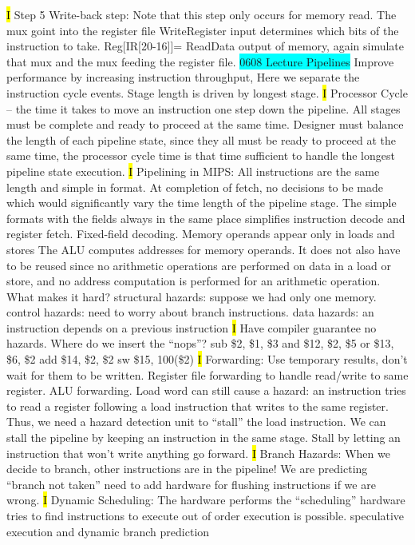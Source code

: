 \documentclass[fontsize=4pt]{scrartcl}
\begin{document}
\hl{I}
Step 5 Write-back step: Note that this step only occurs for memory read. The mux goint into the register file WriteRegister input determines which bits of the instruction to take.
Reg[IR[20-16]]= ReadData output of memory, again simulate that mux and the mux feeding the register file.
\colorbox{Cyan}{0608 Lecture Pipelines} Improve performance by increasing instruction throughput, Here we separate the instruction cycle events.  Stage length is driven by longest stage.
\hl{I}
Processor Cycle – the time it takes to move an instruction one step down the pipeline. All stages must be complete and ready to proceed at the same time. Designer must balance the length of each pipeline state, since they all must be ready to proceed at the same time, the processor cycle time is that time sufficient to handle the longest pipeline state execution.
\hl{I}
Pipelining in MIPS: All instructions are the same length and simple in format. At completion of fetch, no decisions to be made which would significantly vary the time length of the pipeline stage. The simple formats with the fields always in the same place simplifies instruction decode and register fetch.  Fixed-field decoding. Memory operands appear only in loads and stores
The ALU computes addresses for memory operands. It does not also have to be reused since no arithmetic operations are performed on data in a load or store, and no address computation is performed for an arithmetic operation. What makes it hard? structural hazards:  suppose we had only one memory. control hazards:  need to worry about branch instructions. data hazards:  an instruction depends on a previous instruction
\hl{I}
Have compiler guarantee no hazards. Where do we insert the “nops”? sub	\$2, \$1, \$3 and \$12, \$2, \$5 or	\$13, \$6, \$2 add	\$14, \$2, \$2	sw	\$15, 100(\$2)
\hl{I}
Forwarding: Use temporary results, don’t wait for them to be written. Register file forwarding to handle read/write to same register. ALU forwarding. Load word can still cause a hazard: an instruction tries to read a register following a load instruction that writes to the same register. Thus, we need a hazard detection unit to “stall” the load instruction. We can stall the pipeline by keeping an instruction in the same stage. Stall by letting an instruction that won’t write anything go forward.
\hl{I}
Branch Hazards: When we decide to branch, other instructions are in the pipeline! We are predicting “branch not taken”
need to add hardware for flushing instructions if we are wrong.
\hl{I}
Dynamic Scheduling: The hardware performs the “scheduling” hardware tries to find instructions to execute out of order execution is possible. speculative execution and dynamic branch prediction
\end{document}
